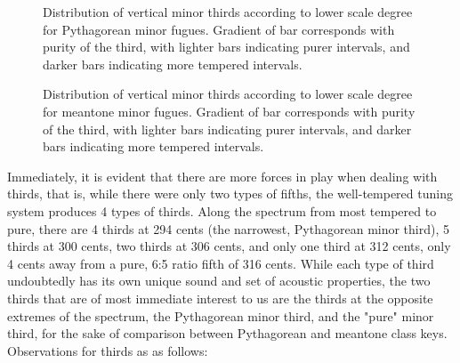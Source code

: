 \begin{figure}[H]
    \begin{center}
    \caption[Distribution of vertical minor thirds, according to lower scale degree for Pythagorean minor fugues. ]{Distribution of vertical minor thirds according to lower scale degree for Pythagorean minor fugues. Gradient of bar corresponds with purity of the third, with lighter bars indicating purer intervals, and darker bars indicating more tempered intervals.}
    \end{center}
\end{figure}
    


\begin{figure}[H]
    \begin{center}
    \caption[Distribution of vertical minor thirds, according to lower scale degree for meantone minor fugues. ]{Distribution of vertical minor thirds according to lower scale degree for meantone minor fugues. Gradient of bar corresponds with purity of the third, with lighter bars indicating purer intervals, and darker bars indicating more tempered intervals.}
    \end{center}
\end{figure}
    
    Immediately, it is evident that there are more forces in play when
dealing with thirds, that is, while there were only two types of fifths,
the well-tempered tuning system produces 4 types of thirds. Along the
spectrum from most tempered to pure, there are 4 thirds at 294 cents
(the narrowest, Pythagorean minor third), 5 thirds at 300 cents, two
thirds at 306 cents, and only one third at 312 cents, only 4 cents away
from a pure, 6:5 ratio fifth of 316 cents. While each type of third
undoubtedly has its own unique sound and set of acoustic properties, the
two thirds that are of most immediate interest to us are the thirds at
the opposite extremes of the spectrum, the Pythagorean minor third, and
the "pure" minor third, for the sake of comparison between Pythagorean
and meantone class keys. Observations for thirds as as follows:


